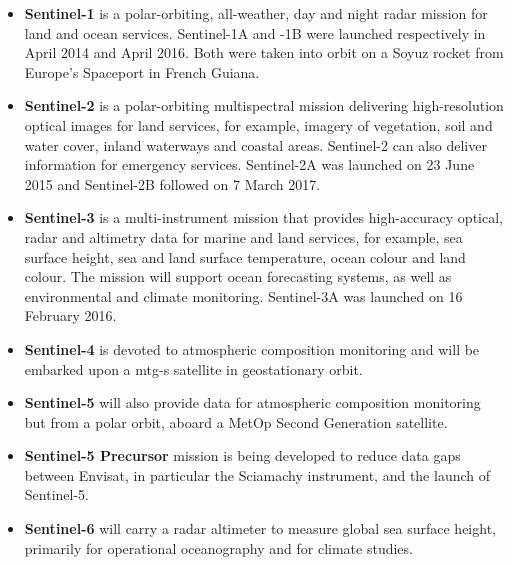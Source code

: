 \documentclass{article}
\begin{document}
\begin{itemize}

\item \textbf{Sentinel-1} is a polar-orbiting, all-weather, day and night radar mission for land and ocean services. Sentinel-1A and -1B were launched respectively in April 2014 and April 2016. Both were taken into orbit on a Soyuz rocket from Europe's Spaceport in French Guiana.

\item \textbf{Sentinel-2} is a polar-orbiting multispectral mission delivering high-resolution optical images for land services, for example, imagery of vegetation, soil and water cover, inland waterways and coastal areas. Sentinel-2 can also deliver information for emergency services. Sentinel-2A was launched on 23 June 2015 and Sentinel-2B followed on 7 March 2017. 

\item \textbf{Sentinel-3} is a multi-instrument mission that provides high-accuracy optical, radar and altimetry data for marine and land services, for example, sea surface height, sea and land surface temperature, ocean colour and land colour. The mission will support ocean forecasting systems, as well as environmental and climate monitoring. Sentinel-3A was launched on 16 February 2016. 

\item \textbf{Sentinel-4} is devoted to atmospheric composition monitoring and will be embarked upon a \ac{mtg-s} satellite in geostationary orbit. 

\item \textbf{Sentinel-5} will also provide data for atmospheric composition monitoring but from a polar orbit, aboard a MetOp Second Generation satellite.

\item \textbf{Sentinel-5 Precursor} mission is being developed to reduce data gaps between Envisat, in particular the Sciamachy instrument, and the launch of Sentinel-5. 

\item \textbf{Sentinel-6} will carry a radar altimeter to measure global sea surface height, primarily for operational oceanography and for climate studies. 

\end{itemize}
\end{document}
